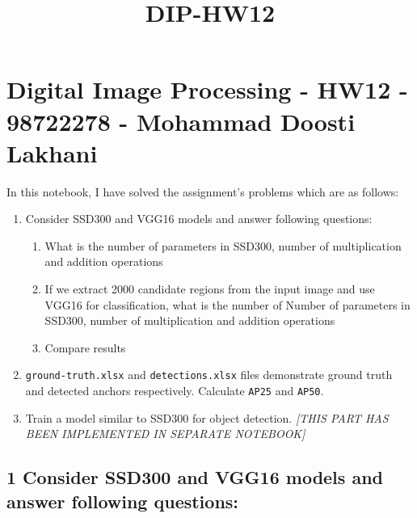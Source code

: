 \documentclass[11pt]{article}
\title{DIP-HW12}
\providecommand{\tightlist}{%
      \setlength{\itemsep}{0pt}\setlength{\parskip}{0pt}}
\begin{document}
    
    
    \maketitle
    
    

    
    \hypertarget{digital-image-processing---hw12---98722278---mohammad-doosti-lakhani}{%
\section{Digital Image Processing - HW12 - 98722278 - Mohammad Doosti
Lakhani}\label{digital-image-processing---hw12---98722278---mohammad-doosti-lakhani}}

In this notebook, I have solved the assignment's problems which are as
follows:

\begin{enumerate}
\def\labelenumi{\arabic{enumi}.}
\tightlist
\item
  Consider SSD300 and VGG16 models and answer following questions:

  \begin{enumerate}
  \def\labelenumii{\arabic{enumii}.}
  \tightlist
  \item
    What is the number of parameters in SSD300, number of multiplication
    and addition operations
  \item
    If we extract 2000 candidate regions from the input image and use
    VGG16 for classification, what is the number of Number of parameters
    in SSD300, number of multiplication and addition operations
  \item
    Compare results
  \end{enumerate}
\item
  \texttt{ground-truth.xlsx} and \texttt{detections.xlsx} files
  demonstrate ground truth and detected anchors respectively. Calculate
  \texttt{AP25} and \texttt{AP50}.
\item
  Train a model similar to SSD300 for object detection. \emph{{[}THIS
  PART HAS BEEN IMPLEMENTED IN SEPARATE NOTEBOOK{]}}
\end{enumerate}

    \hypertarget{consider-ssd300-and-vgg16-models-and-answer-following-questions}{%
\subsection{1 Consider SSD300 and VGG16 models and answer following
questions:}\label{consider-ssd300-and-vgg16-models-and-answer-following-questions}}
\end{document}
